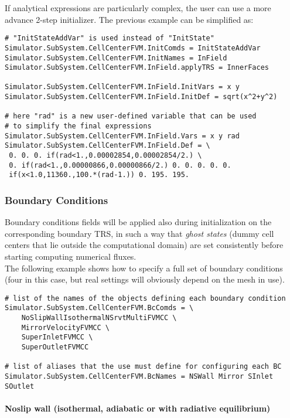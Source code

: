 \documentclass[11pt]{article}
\begin{document}
If analytical expressions are particularly complex, the user can use a more advance
2-step initializer. The previous example can be simplified as:

\begin{verbatim}
# "InitStateAddVar" is used instead of "InitState"
Simulator.SubSystem.CellCenterFVM.InitComds = InitStateAddVar
Simulator.SubSystem.CellCenterFVM.InitNames = InField
Simulator.SubSystem.CellCenterFVM.InField.applyTRS = InnerFaces

Simulator.SubSystem.CellCenterFVM.InField.InitVars = x y
Simulator.SubSystem.CellCenterFVM.InField.InitDef = sqrt(x^2+y^2)

# here "rad" is a new user-defined variable that can be used 
# to simplify the final expressions 
Simulator.SubSystem.CellCenterFVM.InField.Vars = x y rad
Simulator.SubSystem.CellCenterFVM.InField.Def = \
 0. 0. 0. if(rad<1.,0.00002854,0.00002854/2.) \
 0. if(rad<1.,0.00000866,0.00000866/2.) 0. 0. 0. 0. 0. 
 if(x<1.0,11360.,100.*(rad-1.)) 0. 195. 195.
\end{verbatim}

\subsubsection{Boundary Conditions}

Boundary conditions fields will be applied also during initialization on the corresponding boundary TRS,
in such a way that {\it ghost states} (dummy cell centers that lie outside the computational domain) are set 
consistently before starting computing numerical fluxes. \\
The following example shows how to specify a full set of boundary conditions (four in this case, but 
real settings will obviously depend on the mesh in use).

\begin{verbatim}
# list of the names of the objects defining each boundary condition
Simulator.SubSystem.CellCenterFVM.BcComds = \
    NoSlipWallIsothermalNSrvtMultiFVMCC \
    MirrorVelocityFVMCC \
    SuperInletFVMCC \
    SuperOutletFVMCC

# list of aliases that the use must define for configuring each BC
Simulator.SubSystem.CellCenterFVM.BcNames = NSWall Mirror SInlet SOutlet
\end{verbatim}

\paragraph{Noslip wall (isothermal, adiabatic or with radiative equilibrium)}
\end{document}
